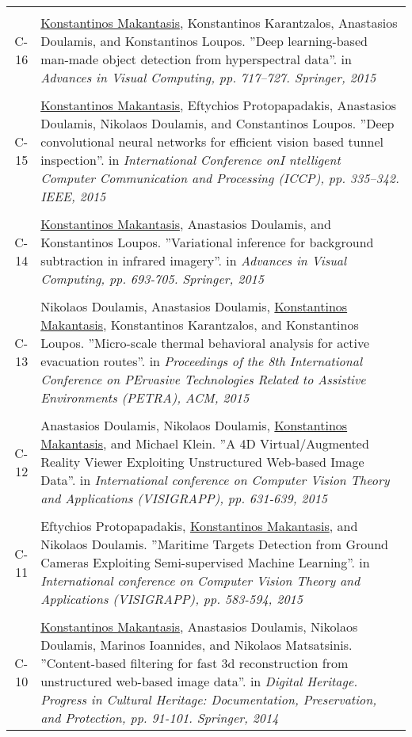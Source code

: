 \documentclass[a4paper,10pt]{article}
\begin{document}
\begin{longtable}{r p{11cm}}
 \multicolumn{2}{c}{} \\
C-16 &\small{\underline{Konstantinos Makantasis}, Konstantinos Karantzalos, Anastasios Doulamis, and Konstantinos Loupos. ''Deep learning-based man-made object detection from hyperspectral data''. in \textit{Advances in Visual Computing, pp. 717–727. Springer, 2015}}\\
 \multicolumn{2}{c}{} \\
C-15 &\small{\underline{Konstantinos Makantasis}, Eftychios Protopapadakis, Anastasios Doulamis, Nikolaos Doulamis, and Constantinos Loupos. ''Deep convolutional neural networks for efficient vision based tunnel inspection''. in \textit{International Conference onI ntelligent Computer Communication and Processing (ICCP), pp. 335–342. IEEE, 2015}}\\
 \multicolumn{2}{c}{} \\
C-14 &\small{\underline{Konstantinos Makantasis}, Anastasios Doulamis, and Konstantinos Loupos. ''Variational inference for background subtraction in infrared imagery''. in \textit{Advances in Visual Computing, pp. 693-705. Springer, 2015}}\\
 \multicolumn{2}{c}{} \\
C-13 &\small{Nikolaos Doulamis, Anastasios Doulamis, \underline{Konstantinos Makantasis}, Konstantinos Karantzalos, and Konstantinos Loupos. ''Micro-scale thermal behavioral analysis for active evacuation routes''. in \textit{Proceedings of the 8th  International Conference on PErvasive Technologies Related to Assistive Environments (PETRA), ACM, 2015}}\\
 \multicolumn{2}{c}{} \\
C-12 &\small{Anastasios Doulamis, Nikolaos Doulamis, \underline{Konstantinos Makantasis}, and Michael Klein. ''A 4D Virtual/Augmented Reality Viewer Exploiting Unstructured Web-based Image Data''. in \textit{International conference on Computer Vision Theory and Applications (VISIGRAPP), pp. 631-639, 2015}}\\
 \multicolumn{2}{c}{} \\
C-11 &\small{Eftychios Protopapadakis, \underline{Konstantinos Makantasis}, and Nikolaos Doulamis. ''Maritime Targets Detection from Ground Cameras Exploiting Semi-supervised Machine Learning''. in \textit{International conference on Computer Vision Theory and Applications (VISIGRAPP), pp. 583-594, 2015}}\\
 \multicolumn{2}{c}{} \\
C-10 &\small{\underline{Konstantinos Makantasis}, Anastasios Doulamis, Nikolaos Doulamis, Marinos Ioannides, and Nikolaos Matsatsinis. ''Content-based filtering for fast 3d reconstruction from unstructured web-based image data''. in \textit{Digital Heritage. Progress in Cultural Heritage: Documentation, Preservation, and Protection, pp. 91-101. Springer, 2014}}\\

\end{longtable}
\end{document}

